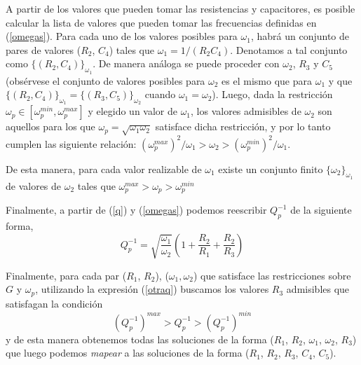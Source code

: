 \documentclass{llncs}
\begin{document}
    
    A partir de los valores que pueden tomar las resistencias y capacitores, es
    posible calcular la lista de valores que pueden tomar las frecuencias
    definidas en (\ref{omegas}). Para cada uno de los valores posibles para
    $\omega_1$, habr\'a un conjunto de pares de valores ($R_2$, $C_4$) tales que
    $\omega_1 = 1/(R_2 C_4)$. Denotamos a tal conjunto como $\{(R_2,
      C_4)\}_{\omega_1}$. De manera an\'aloga se puede proceder con $\omega_2$,
      $R_3$ y $C_5$ (obs\'ervese el conjunto de valores posibles para $\omega_2$
      es el mismo que para $\omega_1$ y que $\{(R_2,C_4)\}_{\omega_1}=\{(R_3,
      C_5)\}_{\omega_2}$ cuando $\omega_1=\omega_2$). Luego, dada la restricci\'on $\omega_p \in 
    [\omega_p^{min},\omega_p^{max}]$ y elegido un valor de  $\omega_1$, los
    valores admisibles de $\omega_2$ son aquellos para los 
    que $\omega_p= \sqrt{\omega_1 \omega_2}$ satisface dicha restricci\'on, y
    por lo tanto cumplen las siguiente relaci\'on:
    $(\omega_p^{max})^2 / \omega_1 > \omega_2 > (\omega_p^{min})^2 / \omega_1 $.

    De esta manera, para cada valor realizable de $\omega_1$ existe un conjunto
    finito $\{{\omega_2}\}_{\omega_1}$ de valores de $\omega_2$ 
    tales que $ \omega_p^{max} > \omega_p > \omega_p^{min} $

    Finalmente, a partir de (\ref{q}) y (\ref{omegas}) podemos reescribir
    $Q_p^{-1}$ de la siguiente forma,
    \begin{equation}
    Q_p^{-1} =
    \sqrt{\frac{\omega_1}{\omega_2}}\left(1+\frac{R_2}{R_1}+\frac{R_2}{R_3}\right)
    \label{otraq}
    \end{equation}
    
    Finalmente, para cada par ($R_1$, $R_2$), ($\omega_1, \omega_2$) que satisface
    las restricciones sobre $G$ y $\omega_p$, utilizando la expresión
    (\ref{otraq}) buscamos
    los valores $R_3$ admisibles que satisfagan la 
    condici\'on
    $$
    (Q_p^{-1})^{max} > Q_p^{-1} > (Q_p^{-1})^{min}
    $$
    y de esta manera obtenemos todas las soluciones de la forma ($R_1$, $R_2$,
    $\omega_1$, $\omega_2$, $R_3$)  
    que luego podemos \textit{mapear} a las soluciones de la forma ($R_1$,
    $R_2$, $R_3$, $C_4$, $C_5$). 
\end{document}
